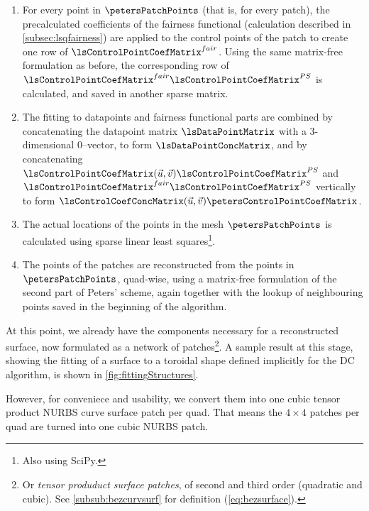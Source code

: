 \begin{enumerate}[resume]
\item For every point in $\petersPatchPoints$ (that is, for every \Bez patch), the precalculated coefficients of the fairness functional (calculation described in \autoref{subsec:lsqfairness}) are applied to the \Bez control points of the patch to create one row of $\lsControlPointCoefMatrix^{fair}$. Using the same matrix-free formulation as before, the corresponding row of $\lsControlPointCoefMatrix^{fair}\lsControlPointCoefMatrix^{PS}$ is calculated, and saved in another sparse matrix.
\item The fitting to datapoints and fairness functional parts are combined by concatenating the datapoint matrix $\lsDataPointMatrix$ with a 3-dimensional $0$--vector, to form $\lsDataPointConcMatrix$, and by concatenating $\lsControlPointCoefMatrix(\vec{u},\vec{v})\lsControlPointCoefMatrix^{PS}$ and  $\lsControlPointCoefMatrix^{fair}\lsControlPointCoefMatrix^{PS}$ vertically to form $\lsControlCoefConcMatrix(\vec{u},\vec{v})\petersControlPointCoefMatrix$.
\item The actual locations of the points in the mesh $\petersPatchPoints$ is calculated using sparse linear least squares\footnote{Also using SciPy.}.
\item The \Bez points of the patches are reconstructed from the points in $\petersPatchPoints$, quad-wise, using a matrix-free formulation of the second part of Peters' scheme, again together with the lookup of neighbouring points saved in the beginning of the algorithm.
\end{enumerate}
At this point, we already have the components necessary for a reconstructed surface, now formulated as a network of \Bez patches\footnote{Or \emph{tensor produduct \Bez surface patches}, of second and third order (quadratic and cubic). See \autoref{subsub:bezcurvsurf} for definition (\autoref{eq:bezsurface}).}. A sample result at this stage, showing the fitting of a surface to a toroidal shape defined implicitly for the \acs{DC} algorithm, is shown in \autoref{fig:fittingStructures}. 

However, for conveniece and usability, we convert them into one cubic tensor product NURBS curve surface patch per quad. That means the $4\times4$ \Bez patches per quad are turned into one cubic NURBS patch. 

